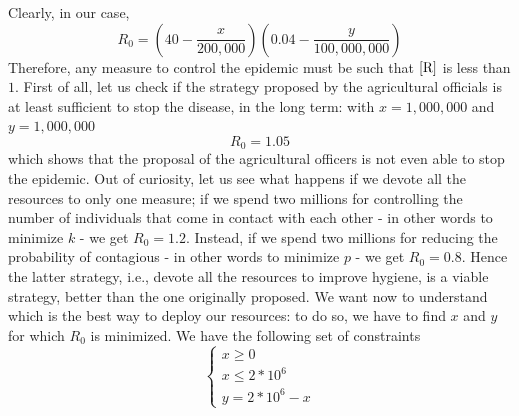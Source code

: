 \documentclass{report}
\theoremstyle{definition}
\theoremstyle{remark}
\begin{document}
Clearly, in our case,
\begin{equation} \label{R}
R_0 = \left(40-\frac{x}{200,000}\right)\left(0.04-\frac{y}{100,000,000}\right)
\end{equation}
Therefore, any measure to control the epidemic must be such that $\eqref{R}$ is less than $1$. First of all, let us check if the strategy proposed by the agricultural officials is at least sufficient to stop the disease, in the long term: with $x = 1,000,000$ and $y = 1,000,000$
\begin{equation*}
R_0 = 1.05
\end{equation*}
which shows that the proposal of the agricultural officers is not even able to stop the epidemic. Out of curiosity, let us see what happens if we devote all the resources to only one measure; if we spend two millions for controlling the number of individuals that come in contact with each other - in other words to minimize $k$ - we get $R_0 = 1.2$. Instead, if we spend two millions for reducing the probability of contagious - in other words to minimize $p$ - we get $R_0 = 0.8$. Hence the latter strategy, i.e., devote all the resources to improve hygiene, is a viable strategy, better than the one originally proposed. 
We want now to understand which is the best way to deploy our resources: to do so, we have to find $x$ and $y$ for which $R_0$ is minimized. We have the following set of constraints
\begin{equation*}
\begin{cases}
x\geq 0
\\ x \leq 2*10^6
\\ y = 2*10^6-x
\end{cases}
\end{equation*}
\end{document}
